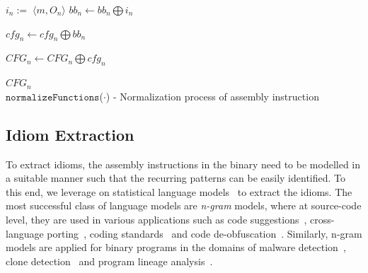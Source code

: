 {\begin{MyAlgo}[!ht]{-4.9cm}
{{{{{{%
    				}
  				}
  				
  			}
  			$i_n := \; \langle m, O_n\rangle$\;
  			$bb_n \longleftarrow bb_n \bigoplus i_n$ \;
   		}
   		$cfg_n \longleftarrow cfg_n \bigoplus  bb_n$ \;
   	}
   	$CFG_n \longleftarrow CFG_n \bigoplus  cfg_n$ \;
   }
  \Return ${CFG_n}$
  \\
 \caption{$\mathtt{normalizeFunctions}$($\cdot$) - Normalization process of assembly instruction}\label{algo:norm}
\end{MyAlgo}
}

\subsection{Idiom Extraction}
To extract idioms, the assembly instructions in the binary need to be modelled in a suitable manner such that the recurring patterns can be easily identified. To this end, we leverage on statistical language models~\cite{hindle2012naturalness} to extract the idioms. The most successful class of language models are \textit{n-gram} models, where at source-code level, they are used in various applications such as code suggestions~\cite{}, cross-language porting~\cite{}, coding standards~\cite{} and code de-obfuscation~\cite{}. Similarly, n-gram models are applied for binary programs in the domains of malware detection~\cite{}, clone detection~\cite{} and program lineage analysis~\cite{}.



